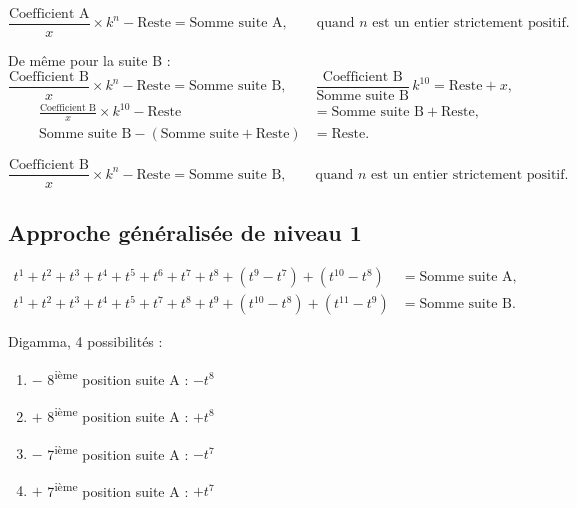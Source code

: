 \documentclass[11pt,a4paper]{article}
\begin{document}
\vspace{0.3cm}
\begin{boiteformule}
\[
\frac{\text{Coefficient A}}{x} \times k^{n} - \text{Reste} = \text{Somme suite A},
\qquad \text{quand } n \text{ est un entier strictement positif.}
\]
\end{boiteformule}

De même pour la suite B :
\[
\frac{\text{Coefficient B}}{x} \times k^{n} - \text{Reste} = \text{Somme suite B},
\qquad
\frac{\text{Coefficient B}}{\text{Somme suite B}}\, k^{10} = \text{Reste} + x ,
\]
\begin{align*}
\frac{\text{Coefficient B}}{x}\times k^{10}-\text{Reste}
&=\text{Somme suite B}+\text{Reste},\\
\text{Somme suite B}-(\text{Somme suite}+\text{Reste})
&=\text{Reste}.
\end{align*}

\vspace{0.3cm}
\begin{boiteformule}
\[
\frac{\text{Coefficient B}}{x} \times k^{n} - \text{Reste} = \text{Somme suite B},
\qquad \text{quand } n \text{ est un entier strictement positif.}
\]
\end{boiteformule}

\subsection{Approche généralisée de niveau 1}

\vspace{0.3cm}
\begin{boiteformule}[Sommes des suites A et B (forme formelle, $n = 10$)]
\begin{align*}
t^{1}+t^{2}+t^{3}+t^{4}+t^{5}+t^{6}+t^{7}+t^{8}+(t^{9}-t^{7})+(t^{10}-t^{8}) &= \text{Somme suite A},\\
t^{1}+t^{2}+t^{3}+t^{4}+t^{5}+t^{7}+t^{8}+t^{9}+(t^{10}-t^{8})+(t^{11}-t^{9}) &= \text{Somme suite B}.
\end{align*}
\end{boiteformule}

Digamma, 4 possibilités :
\begin{enumerate}[nosep]
  \item $-$ 8\textsuperscript{ième} position suite A : $-t^{8}$
  \item $+$ 8\textsuperscript{ième} position suite A : $+t^{8}$
  \item $-$ 7\textsuperscript{ième} position suite A : $-t^{7}$
  \item $+$ 7\textsuperscript{ième} position suite A : $+t^{7}$
\end{enumerate}
\end{document}
